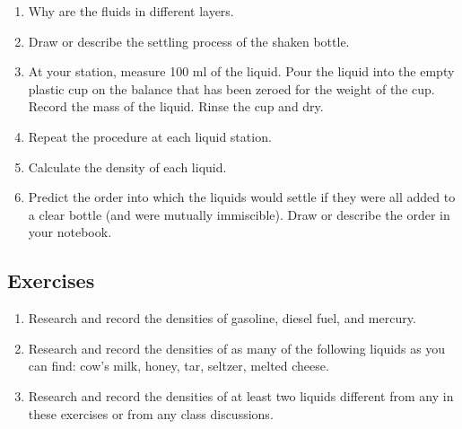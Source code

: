 \begin{enumerate}
\item {} Why are the fluids in different layers. 
\item {} Draw or describe the settling process of the shaken bottle. 
\item At your station, measure 100 ml of the liquid. Pour the liquid into the empty plastic cup on the balance that has been zeroed for the weight of the cup. Record the mass of the liquid. Rinse the cup and dry. 
\item Repeat the procedure at each liquid station. 
\item Calculate the density of each liquid.  
\item Predict the order into which the liquids would settle if they were all added to a clear bottle (and were mutually immiscible). Draw or describe the order in your notebook.
\end{enumerate}

\subsection*{Exercises}
\begin{enumerate}
\item Research and record the densities of gasoline, diesel fuel, and mercury.
\item Research and record the densities of as many of the following liquids as you can find: cow's milk, honey, tar, seltzer, melted cheese.
\item Research and record the densities of at least two liquids different from any in these exercises or from any class discussions.
\end{enumerate}


